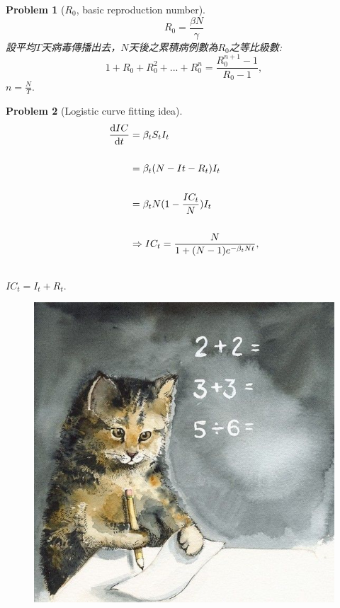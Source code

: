 \documentclass[12pt,a4paper]{article}
\newtheorem*{problem}{Problem}
\begin{document}
\newpage

\begin{problem}[$R_{0}$, basic reproduction number]
$$R_{0}=\frac{\beta N}{\gamma}$$
\quad
設平均$T$天病毒傳播出去，$N$天後之累積病例數為$R_{0}$之等比級數:
$$1+R_{0}+R_{0}^2+...+R_{0}^n=\frac{R_{0}^{n+1}-1}{R_{0}-1},$$
$n=\frac{N}{T}.$
\end{problem}
\quad
\begin{problem}[Logistic curve fitting idea]

\begin{align*}
\odv{IC}{t}&=\beta_{t}S_{t}I_{t}\\
\quad\\
		   &=\beta_{t}(N-I{t}-R_{t})I_{t}\\
		   \quad\\
		   &=\beta_{t}N(1-\frac{IC_{t}}{N})I_{t}\\
		   \quad\\
		   &\Rightarrow IC_{t}=\frac{N}{1+(N-1)e^{-\beta_{t}Nt}},\\
		   \quad
\end{align*}
$IC_{t}=I_{t}+R_{t}.$
\end{problem}

\begin{figure}[H]                        %
\centering                               %
\includegraphics[scale=0.45]{數學貓貓.jpg}
\end{figure}
\end{document}
